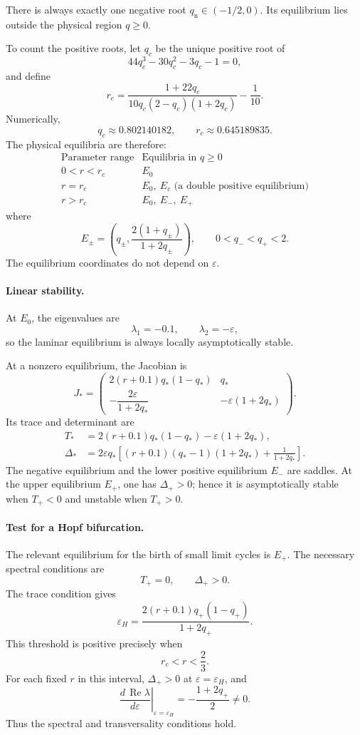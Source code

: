 \documentclass[11pt,reqno]{amsart}
\theoremstyle{plain}
\theoremstyle{definition}
\theoremstyle{remark}
\begin{document}
There is always exactly one negative root
$q_{\mathrm n}\in(-1/2,0)$. Its equilibrium lies outside
the physical region $q\geq0$.

To count the positive roots, let $q_c$ be the unique
positive root of
\[
44q_c^3-30q_c^2-3q_c-1=0,
\]
and define
\[
r_c=
\frac{1+22q_c}{10q_c(2-q_c)(1+2q_c)}-\frac1{10}.
\]
Numerically,
\[
q_c\approx0.802140182,
\qquad r_c\approx0.645189835.
\]
The physical equilibria are therefore:
\[
\begin{array}{c|c}
\text{Parameter range} & \text{Equilibria in }q\geq0\\ \hline
0<r<r_c & E_0\\
r=r_c & E_0,\ E_c\text{ (a double positive equilibrium)}\\
r>r_c & E_0,\ E_-,\ E_+
\end{array}
\]
where
\[
E_\pm=
\left(q_\pm,\frac{2(1+q_\pm)}{1+2q_\pm}\right),
\qquad 0<q_-<q_+<2.
\]
The equilibrium coordinates do not depend on $\varepsilon$.

\paragraph{Linear stability.}
At $E_0$, the eigenvalues are
\[
\lambda_1=-0.1,\qquad \lambda_2=-\varepsilon,
\]
so the laminar equilibrium is always locally
asymptotically stable.

At a nonzero equilibrium, the Jacobian is
\begin{equation}
J_*=
\begin{pmatrix}
2(r+0.1)q_*(1-q_*) & q_*\\[1mm]
-\dfrac{2\varepsilon}{1+2q_*}
&-\varepsilon(1+2q_*)
\end{pmatrix}.
\label{eq:jacobian}
\end{equation}
Its trace and determinant are
\begin{align}
T_*&=
2(r+0.1)q_*(1-q_*)-\varepsilon(1+2q_*),
\label{eq:trace}\\
\Delta_*&=
2\varepsilon q_*
\left[
(r+0.1)(q_*-1)(1+2q_*)
+\frac1{1+2q_*}
\right].
\label{eq:determinant}
\end{align}
The negative equilibrium and the lower positive
equilibrium $E_-$ are saddles. At the upper equilibrium
$E_+$, one has $\Delta_+>0$; hence it is asymptotically
stable when $T_+<0$ and unstable when $T_+>0$.

\paragraph{Test for a Hopf bifurcation.}
The relevant equilibrium for the birth of small limit
cycles is $E_+$. The necessary spectral conditions are
\[
T_+=0,\qquad \Delta_+>0.
\]
The trace condition gives
\begin{equation}
\boxed{
\varepsilon_H=
\frac{2(r+0.1)q_+(1-q_+)}{1+2q_+}.
}
\label{eq:hopf}
\end{equation}
This threshold is positive precisely when
\[
\boxed{r_c<r<\frac23.}
\]
For each fixed $r$ in this interval,
$\Delta_+>0$ at $\varepsilon=\varepsilon_H$, and
\[
\left.
\frac{d\,\operatorname{Re}\lambda}
{d\varepsilon}
\right|_{\varepsilon=\varepsilon_H}
=-\frac{1+2q_+}{2}\neq0.
\]
Thus the spectral and transversality conditions hold.
\end{document}
